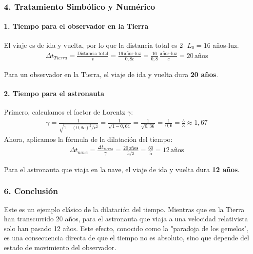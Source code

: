 \subsubsection*{4. Tratamiento Simbólico y Numérico}
\paragraph{1. Tiempo para el observador en la Tierra}
El viaje es de ida y vuelta, por lo que la distancia total es $2 \cdot L_0 = 16$ años-luz.
\begin{gather}
    \Delta t_{Tierra} = \frac{\text{Distancia total}}{v} = \frac{16 \, \text{años-luz}}{0,8c} = \frac{16}{0,8} \, \frac{\text{años-luz}}{c} = 20 \, \text{años}
\end{gather}
\begin{cajaresultado}
Para un observador en la Tierra, el viaje de ida y vuelta dura \textbf{20 años}.
\end{cajaresultado}

\paragraph{2. Tiempo para el astronauta}
Primero, calculamos el factor de Lorentz $\gamma$:
\begin{gather}
    \gamma = \frac{1}{\sqrt{1 - (0,8c)^2/c^2}} = \frac{1}{\sqrt{1 - 0,64}} = \frac{1}{\sqrt{0,36}} = \frac{1}{0,6} = \frac{5}{3} \approx 1,67
\end{gather}
Ahora, aplicamos la fórmula de la dilatación del tiempo:
\begin{gather}
    \Delta t_{nave} = \frac{\Delta t_{Tierra}}{\gamma} = \frac{20 \, \text{años}}{5/3} = \frac{60}{5} = 12 \, \text{años}
\end{gather}
\begin{cajaresultado}
Para el astronauta que viaja en la nave, el viaje de ida y vuelta dura \textbf{12 años}.
\end{cajaresultado}

\subsubsection*{6. Conclusión}
\begin{cajaconclusion}
Este es un ejemplo clásico de la dilatación del tiempo. Mientras que en la Tierra han transcurrido 20 años, para el astronauta que viaja a una velocidad relativista solo han pasado 12 años. Este efecto, conocido como la "paradoja de los gemelos", es una consecuencia directa de que el tiempo no es absoluto, sino que depende del estado de movimiento del observador.
\end{cajaconclusion}

